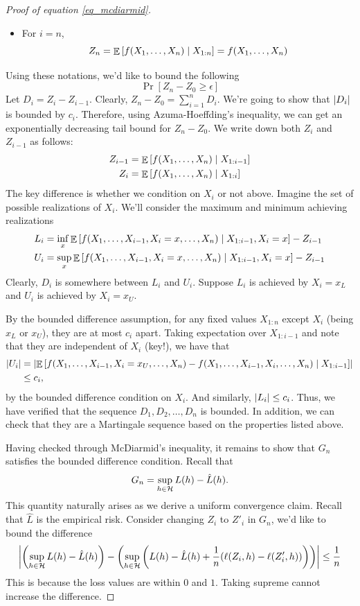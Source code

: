 \begin{proof}[Proof of equation \eqref{eq_mcdiarmid}]
\begin{itemize}
    \item For $i = n$, \[ Z_n = \mathop{\mathbb{E}}\left[ f(X_1, \dots, X_n) \mid X_{1:n} \right] = f(X_1, \dots, X_n) \]
\end{itemize}
Using these notations, we’d like to bound the following
\[ \Pr[Z_n - Z_0 \ge \epsilon] \]
Let $D_i = Z_i - Z_{i-1}$. Clearly, $Z_n - Z_0 = \sum_{i=1}^n D_i$.
We’re going to show that $\left\lvert D_i\right\rvert$ is bounded by $c_i$.
Therefore, using Azuma-Hoeffding’s inequality, we can get an exponentially decreasing tail bound for $Z_n - Z_0$.
We write down both $Z_i$ and $Z_{i-1}$ as follows:
\begin{align*}
    Z_{i-1} &= \mathop{\mathbb{E}}\left[ f(X_1, \dots, X_n) \mid X_{1:i-1} \right] \\
    Z_i &= \mathop{\mathbb{E}}\left[ f(X_1, \dots, X_n) \mid X_{1:i} \right]
\end{align*}
The key difference is whether we condition on $X_i$ or not above.
Imagine the set of possible realizations of $X_i$.
We’ll consider the maximum and minimum achieving realizations
\begin{align*}
    L_i &= \inf_{x} \mathop{\mathbb{E}}\left[ f(X_1, \dots, X_{i-1}, X_i = x, \dots, X_n) \mid X_{1:i-1}, X_i = x \right] - Z_{i-1} \\
    U_i &= \sup_{x} \mathop{\mathbb{E}}\left[ f(X_1, \dots, X_{i-1}, X_i = x, \dots, X_n) \mid X_{1:i-1}, X_i = x \right] - Z_{i-1}
\end{align*}
Clearly, $D_i$ is somewhere between $L_i$ and $U_i$.
Suppose $L_i$ is achieved by $X_i = x_L$ and $U_i$ is achieved by $X_i = x_U$.

By the bounded difference assumption, for any fixed values $X_{1:n}$ except $X_i$ (being $x_L$ or $x_U$), they are at most $c_i$ apart.
Taking expectation over $X_{1:i-1}$ and note that they are independent of $X_i$ (key!), we have that
\begin{align*} 
{\left| {U_i} \right|} &= {\left| {\mathop{\mathbb{E}}\left[  f(X_1, \dots, X_{i-1}, X_i = x_U, \dots, X_n) - f(X_1, \dots, X_{i-1}, X_i, \dots, X_n) \mid X_{1:i-1} \right]} \right|}\\
&\le c_i,
\end{align*}
by the bounded difference condition on $X_i$.
And similarly, $\left\lvert L_i\right\rvert \le c_i$.
Thus, we have verified that the sequence $D_1, D_2, \dots, D_n$ is bounded.
In addition, we can check that they are a Martingale sequence based on the properties listed above.

Having checked through McDiarmid's inequality, it remains to show that $G_n$ satisfies the bounded difference condition.
Recall that \[ G_n = \sup_{h\in \mathcal{H}} L(h) - \hat L(h). \]
This quantity naturally arises as we derive a uniform convergence claim.
Recall that $\hat L$ is the empirical risk.
Consider changing $Z_i$ to $Z'_i$ in $G_n$, we’d like to bound the difference
\begin{align*}
    {\left| { \left(\sup_{h\in\mathcal{H}} L(h) - \hat L(h) \right) - \left( \sup_{h\in\mathcal{H}} \left( L(h ) - \hat L(h) + \frac 1 n ( \ell(Z_i, h) - \ell(Z'_i, h) ) \right) \right) } \right|} \le \frac 1 n
\end{align*}
This is because the loss values are within $0$ and $1$.
Taking supreme cannot increase the difference.
\end{proof}

